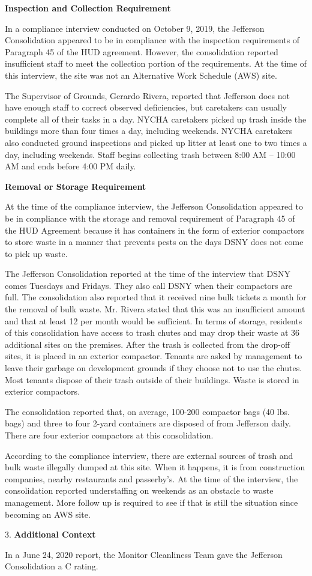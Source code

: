 
\textbf{Inspection and Collection Requirement}

In a compliance interview conducted on October 9, 2019, the Jefferson Consolidation appeared to be in compliance with the inspection requirements of Paragraph 45 of the HUD agreement. However, the consolidation reported insufficient staff to meet the collection portion of the requirements. At the time of this interview, the site was not an Alternative Work Schedule (AWS) site. 

The Supervisor of Grounds, Gerardo Rivera, reported that Jefferson does not have enough staff to correct observed deficiencies, but caretakers can usually complete all of their tasks in a day. NYCHA caretakers picked up trash inside the buildings more than four times a day, including weekends. NYCHA caretakers also conducted ground inspections and picked up litter at least one to two times a day, including weekends. Staff begins collecting trash between 8:00 AM -- 10:00 AM and ends before 4:00 PM daily.

\textbf{Removal or Storage Requirement}

At the time of the compliance interview, the Jefferson Consolidation appeared to be in compliance with the storage and removal requirement of Paragraph 45 of the HUD Agreement because it has containers in the form of exterior compactors to store waste in a manner that prevents pests on the days DSNY does not come to pick up waste.

The Jefferson Consolidation reported at the time of the interview that DSNY comes Tuesdays and Fridays. They also call DSNY when their compactors are full. The consolidation also reported that it received nine bulk tickets a month for the removal of bulk waste. Mr. Rivera stated that this was an insufficient amount and that at least 12 per month would be sufficient.  In terms of storage, residents of this consolidation have access to trash chutes and may drop their waste at 36 additional sites on the premises. After the trash is collected from the drop-off sites, it is placed in an exterior compactor. Tenants are asked by management to leave their garbage on development grounds if they choose not to use the chutes. Most tenants dispose of their trash outside of their buildings. Waste is stored in exterior compactors. 

The consolidation reported that, on average, 100-200 compactor bags (40 lbs. bags) and three to four 2-yard containers are disposed of from Jefferson daily. There are four exterior compactors at this consolidation.

According to the compliance interview, there are external sources of trash and bulk waste illegally dumped at this site. When it happens, it is from construction companies, nearby restaurants and passerby's. At the time of the interview, the consolidation reported understaffing on weekends as an obstacle to waste management. More follow up is required to see if that is still the situation since becoming an AWS site.

3. \textbf{Additional Context} 

In a June 24, 2020 report, the Monitor Cleanliness Team gave the Jefferson Consolidation a C rating. 